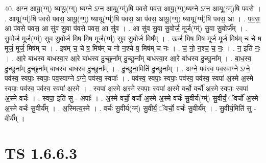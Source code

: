 \documentclass[17pt]{extarticle}
\begin{document}
40. अग्न॒ आयू॒(ग्ग्॒) ष्यायू॒(ग्ग्॒) ष्यग्ने ऽग्न॒ आयू(ग्म्॑)षि पवसे पवस॒ आयू॒(ग्ग्॒)ष्यग्ने ऽग्न॒ आयू(ग्म्॑)षि पवसे । . आयू(ग्म्॑)षि पवसे पवस॒ आयू॒(ग्ग्॒) ष्यायू(ग्म्॑)षि पवस॒ आ प॑वस॒ आयू॒(ग्ग्॒) ष्यायू(ग्म्॑)षि पवस॒ आ । . प॒व॒स॒ आ प॑वसे पवस॒ आ सु॑व सु॒वा प॑वसे पवस॒ आ सु॑व । . आ सु॑व सु॒वा सु॒वोर्ज॒ मूर्ज(ग्म्॑) सु॒वा सु॒वोर्ज᳚म् । . सु॒वोर्ज॒ मूर्ज(ग्म्॑) सुव सु॒वोर्ज॒ मिष॒ मिष॒ मूर्ज(ग्म्॑) सुव सु॒वोर्ज॒ मिष᳚म् । . ऊर्ज॒ मिष॒ मिष॒ मूर्ज॒ मूर्ज॒ मिष॑म् च॒ चे ष॒ मूर्ज॒ मूर्ज॒ मिष॑म् च । . इष॑म् च॒ चे ष॒ मिष॑म् च नो न॒श्चे ष॒ मिष॑म् च नः । . च॒ नो॒ न॒श्च॒ च॒ नः॒ । . न॒ इति॑ नः॒ । . आ॒रे बा॑धस्व बाधस्वा॒र आ॒रे बा॑धस्व दु॒च्छुना᳚म् दु॒च्छुना᳚म् बाधस्वा॒र आ॒रे बा॑धस्व दु॒च्छुना᳚म् । . बा॒ध॒स्व॒ दु॒च्छुना᳚म् दु॒च्छुना᳚म् बाधस्व बाधस्व दु॒च्छुना᳚म् । . दु॒च्छुना॒मिति॑ दु॒च्छुना᳚म् । . अग्ने॒ पव॑स्व॒ पव॒स्वाग्ने ऽग्ने॒ पव॑स्व॒ स्वपाः॒ स्वपाः॒ पव॒स्वाग्ने ऽग्ने॒ पव॑स्व॒ स्वपाः᳚ । . पव॑स्व॒ स्वपाः॒ स्वपाः॒ पव॑स्व॒ पव॑स्व॒ स्वपा॑ अ॒स्मे अ॒स्मे स्वपाः॒ पव॑स्व॒ पव॑स्व॒ स्वपा॑ अ॒स्मे । . स्वपा॑ अ॒स्मे अ॒स्मे स्वपाः॒ स्वपा॑ अ॒स्मे वर्चो॒ वर्चो॑ अ॒स्मे स्वपाः॒ स्वपा॑ अ॒स्मे वर्चः॑ । . स्वपा॒ इति॑ सु - अपाः᳚ । . अ॒स्मे वर्चो॒ वर्चो॑ अ॒स्मे अ॒स्मे वर्चः॑ सु॒वीर्य(ग्म्॑) सु॒वीर्यं॒ ॅवर्चो॑ अ॒स्मे अ॒स्मे वर्चः॑ सु॒वीर्य᳚म् । . अ॒स्मित्य॒स्मे । . वर्चः॑ सु॒वीर्य(ग्म्॑) सु॒वीर्यं॒ ॅवर्चो॒ वर्चः॑ सु॒वीर्य᳚म् । . सु॒वीर्य॒मिति॑ सु - वीर्य᳚म् । \newline
\pagebreak
{}
\section*{ TS 1.6.6.3 }
\end{document}
